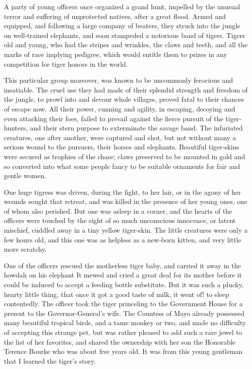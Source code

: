 \documentclass[12pt]{book}
\begin{document}
A party of young officers once organized a grand hunt, impelled by the
unusual terror and suffering of unprotected natives, after a great flood. Armed
and equipped, and following a large company of beaters, they struck into the
jungle on well‐trained elephants, and soon stampeded a notorious band of tigers.
Tigers old and young, who had the stripes and wrinkles, the claws and teeth, and
all the marks of race implying pedigree, which would entitle them to prizes in
any competition for tiger honors in the world.

This particular group moreover, was known to be uncommonly ferocious and
insatiable. The cruel use they had made of their splendid strength and freedom of
the jungle, to prowl into and devour whole villages, proved fatal to their chances of
escape now. All their power, cunning and agility, in escaping, decoying and even
attacking their foes, failed to prevail against the fierce pursuit of the tiger‐hunters,
and their stern purpose to exterminate the savage band. The infuriated creatures,
one after another, were captured and shot, but not without many a serious wound
to the pursuers, their horses and elephants. Beautiful tiger‐skins were secured as
trophies of the chase; claws preserved to be mounted in gold and so converted
into what some people fancy to be suitable ornaments for fair and gentle women.

One huge tigress was driven, during the fight, to her lair, or in the agony of
her wounds sought that retreat, and was killed in the presence of her young ones,
one of whom also perished. But one was asleep in a corner, and the hearts of the
officers were touched by the sight of so much unconscious innocence, or latent
mischief, cuddled away in a tiny yellow tiger‐skin. The little creatures were only
a few hours old, and this one was as helpless as a new‐born kitten, and very little
more scratchy.

One of the officers rescued the motherless tiger baby, and carried it away
in the howdah on his elephant It mewed and cried a great deal for its mother
before it could be induced to accept a feeding bottle substitute. But it was such a
plucky, hearty little thing, that once it got a good taste of milk, it went of! to sleep
contentedly. The officer took the tiger princeling to the Government House for a
present to the Governor‐General’s wife. The Countess of Mayo already possessed
many beautiful tropical birds, and a tame monkey or two, and made no difficulty
of accepting this strange pet, but was rather pleased to add such a rare jewel to
the list of her favorites, and shared the ownership with her son the Honorable
Terence Bourke who was about five years old. It was from this young gentleman
that I learned the tiger’s story.
\end{document}
